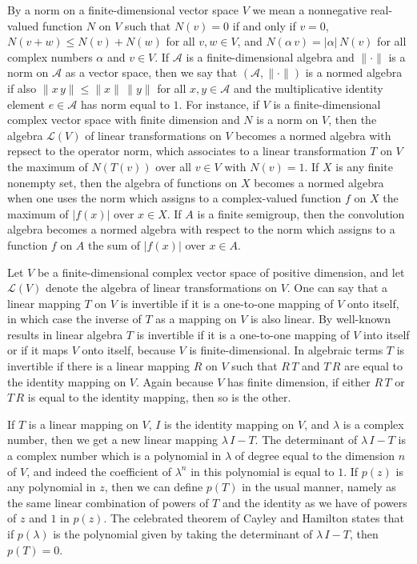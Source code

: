 \documentclass[12pt,leqno,draft]{article}
\begin{document}
	By a norm on a finite-dimensional vector space $V$ we mean a
nonnegative real-valued function $N$ on $V$ such that $N(v) = 0$ if
and only if $v = 0$, $N(v + w) \le N(v) + N(w)$ for all $v, w \in V$,
and $N(\alpha \, v) = |\alpha| \, N(v)$ for all complex numbers
$\alpha$ and $v \in V$.  If $\mathcal{A}$ is a finite-dimensional
algebra and $\|\cdot \|$ is a norm on $\mathcal{A}$ as a vector space,
then we say that $(\mathcal{A}, \|\cdot \|)$ is a normed algebra if
also $\|x \, y \| \le \|x\| \, \|y\|$ for all $x, y \in \mathcal{A}$
and the multiplicative identity element $e \in \mathcal{A}$ has norm
equal to $1$.  For instance, if $V$ is a finite-dimensional complex
vector space with finite dimension and $N$ is a norm on $V$, then the
algebra $\mathcal{L}(V)$ of linear transformations on $V$ becomes a
normed algebra with repsect to the operator norm, which associates to
a linear transformation $T$ on $V$ the maximum of $N(T(v))$ over all
$v \in V$ with $N(v) = 1$.  If $X$ is any finite nonempty set, then
the algebra of functions on $X$ becomes a normed algebra when one uses
the norm which assigns to a complex-valued function $f$ on $X$ the
maximum of $|f(x)|$ over $x \in X$.  If $A$ is a finite semigroup,
then the convolution algebra becomes a normed algebra with respect to
the norm which assigns to a function $f$ on $A$ the sum of $|f(x)|$
over $x \in A$.




 


	Let $V$ be a finite-dimensional complex vector space of
positive dimension, and let $\mathcal{L}(V)$ denote the algebra of
linear transformations on $V$.  One can say that a linear mapping $T$
on $V$ is invertible if it is a one-to-one mapping of $V$ onto itself,
in which case the inverse of $T$ as a mapping on $V$ is also linear.
By well-known results in linear algebra $T$ is invertible if it is a
one-to-one mapping of $V$ into itself or if it maps $V$ onto itself,
because $V$ is finite-dimensional.  In algebraic terms $T$ is
invertible if there is a linear mapping $R$ on $V$ such that $R \, T$
and $T \, R$ are equal to the identity mapping on $V$.  Again because
$V$ has finite dimension, if either $R \, T$ or $T \, R$ is equal to
the identity mapping, then so is the other.

	If $T$ is a linear mapping on $V$, $I$ is the identity mapping
on $V$, and $\lambda$ is a complex number, then we get a new linear
mapping $\lambda \, I - T$.  The determinant of $\lambda \, I - T$ is
a complex number which is a polynomial in $\lambda$ of degree equal to
the dimension $n$ of $V$, and indeed the coefficient of $\lambda^n$ in
this polynomial is equal to $1$.  If $p(z)$ is any polynomial in $z$,
then we can define $p(T)$ in the usual manner, namely as the same
linear combination of powers of $T$ and the identity as we have of
powers of $z$ and $1$ in $p(z)$.  The celebrated theorem of Cayley and
Hamilton states that if $p(\lambda)$ is the polynomial given by taking
the determinant of $\lambda \, I - T$, then $p(T) = 0$.
\end{document}
